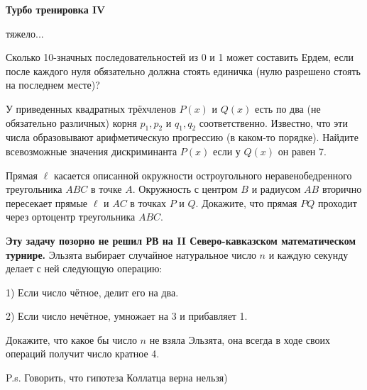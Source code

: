 \centerline{\bf \Huge Турбо тренировка IV}
\centerline{\bf \Huge }

\begin{flushright}
        \scriptsize{тяжело...}
\end{flushright}

Сколько 10-значных последовательностей из 0 и 1 может составить Ердем, если после каждого нуля обязательно должна стоять единичка (нулю разрешено стоять на последнем месте)?

У приведенных квадратных трёхчленов $P(x)$ и $Q(x)$ есть по два (не обязательно различных) корня $p_1, p_2$ и $q_1, q_2$ соответственно. Известно, что эти числа образовывают арифметическую прогрессию (в каком-то порядке). Найдите всевозможные значения дискриминанта $P(x)$ если у $Q(x)$ он равен 7.

Прямая $\ell$ касается описанной окружности остроугольного неравенобедренного треугольника $A B C$ в точке $A$. Окружность с центром $B$ и радиусом $A B$ вторично пересекает прямые $\ell$ и $A C$ в точках $P$ и $Q$. Докажите, что прямая $P Q$ проходит через ортоцентр треугольника $A B C$.

\textbf{Эту задачу позорно не решил РВ на II Северо-кавказском математическом турнире.}
Эльзята выбирает случайное натуральное число $n$ и каждую секунду делает с ней следующую операцию:

1) Если число чётное, делит его на два.

2) Если число нечётное, умножает на 3 и прибавляет 1.

Докажите, что какое бы число $n$ не взяла Эльзята, она всегда в ходе своих операций получит число кратное 4.

P.s. Говорить, что гипотеза Коллатца верна нельзя)